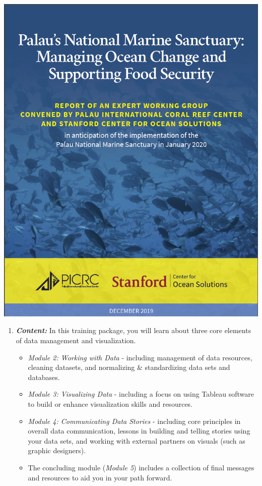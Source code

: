 \documentclass[
]{book}
\providecommand{\tightlist}{%
  \setlength{\itemsep}{0pt}\setlength{\parskip}{0pt}}
\begin{document}
\includegraphics{images/PNMS_Report_Cover.png}

\begin{enumerate}
\def\labelenumi{\arabic{enumi}.}
\setcounter{enumi}{2}
\item
  \textbf{\emph{Content:}} In this training package, you will learn about three core elements of data management and visualization.

  \begin{itemize}
  \tightlist
  \item
    \emph{Module 2: Working with Data} - including management of data resources, cleaning datasets, and normalizing \& standardizing data sets and databases.
  \item
    \emph{Module 3: Visualizing Data} - including a focus on using Tableau software to build or enhance visualization skills and resources.
  \item
    \emph{Module 4: Communicating Data Stories} - including core principles in overall data communication, lessons in building and telling stories using your data sets, and working with external partners on visuals (such as graphic designers).
  \item
    The concluding module (\emph{Module 5}) includes a collection of final messages and resources to aid you in your path forward.
  \end{itemize}
\end{enumerate}
\end{document}
